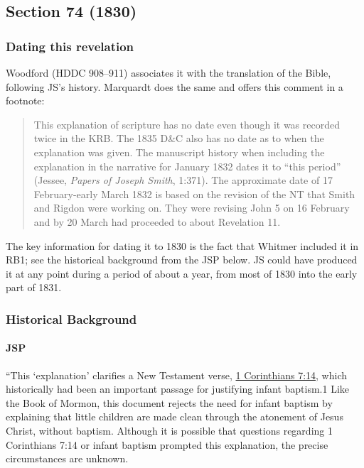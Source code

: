 \subsection{Section 74 (1830)}
	\label{DC74}
	
	\subsubsection{Dating this revelation}
	
		Woodford (HDDC 908--911) associates it with the translation of the Bible, following JS's history. Marquardt does the same and offers this comment in a footnote:
		
			\begin{quote}
				This explanation of scripture has no date even though it was recorded twice in the KRB. The 1835 D\&C also has no date as to when the explanation was given. The manuscript history when including the explanation in the narrative for January 1832 dates it to ``this period'' (Jessee, \textit{Papers of Joseph Smith}, 1:371). The approximate date of 17 February-early March 1832 is based on the revision of the NT that Smith and Rigdon were working on. They were revising John 5 on 16 February and by 20 March had proceeded to about Revelation 11.
			\end{quote}
			
		The key information for dating it to 1830 is the fact that Whitmer included it in RB1; see the historical background from the JSP below. JS could have produced it at any point during a period of about a year, from most of 1830 into the early part of 1831.
	
	\subsubsection{Historical Background}
		\label{DC74-HB}
		
		\paragraph{JSP}
		
			``This `explanation' clarifies a New Testament verse, \hyperref[1CORINTHIANS-7-14]{1 Corinthians 7:14}, which historically had been an important passage for justifying infant baptism.1 Like the Book of Mormon, this document rejects the need for infant baptism by explaining that little children are made clean through the atonement of Jesus Christ, without baptism. Although it is possible that questions regarding 1 Corinthians 7:14 or infant baptism prompted this explanation, the precise circumstances are unknown.
			
